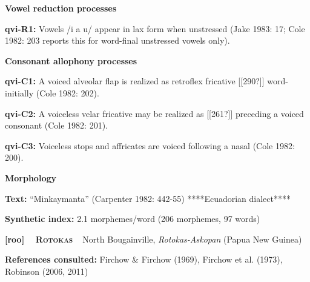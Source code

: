 \begin{styleBody}
\textbf{Vowel reduction processes}
\end{styleBody}

\begin{styleBody}
\textbf{qvi-R1:} Vowels /i a u/ appear in lax form when unstressed (Jake 1983: 17; Cole 1982: 203 reports this for word-final unstressed vowels only).
\end{styleBody}

\begin{styleBody}
\textbf{Consonant allophony processes}
\end{styleBody}

\begin{styleBody}
\textbf{qvi-C1: }A voiced alveolar flap is realized as retroflex fricative [[290?]] word-initially (Cole 1982: 202).
\end{styleBody}

\begin{styleBody}
\textbf{qvi-C2: }A voiceless velar fricative may be realized as [[261?]] preceding a voiced consonant (Cole 1982: 201).
\end{styleBody}

\begin{styleBody}
\textbf{qvi-C3: }Voiceless stops and affricates are voiced following a nasal (Cole 1982: 200).
\end{styleBody}

\begin{styleBody}
\textbf{Morphology}
\end{styleBody}

\begin{styleBody}
\textbf{Text:} “Minkaymanta” (Carpenter 1982: 442-55) ****Ecuadorian dialect****
\end{styleBody}

\begin{styleBody}
\textbf{Synthetic index: }2.1 morphemes/word (206 morphemes, 97 words)
\end{styleBody}

\clearpage\begin{styleBody}
\textbf{[roo] }\ \ \textbf{\textsc{Rotokas}}\textbf{\ \ }North Bougainville, \textit{Rotokas-Askopan} (Papua New Guinea)
\end{styleBody}

\begin{styleBody}
\textbf{References consulted: }Firchow \& Firchow (1969), Firchow et al. (1973), Robinson (2006, 2011) 
\end{styleBody}

